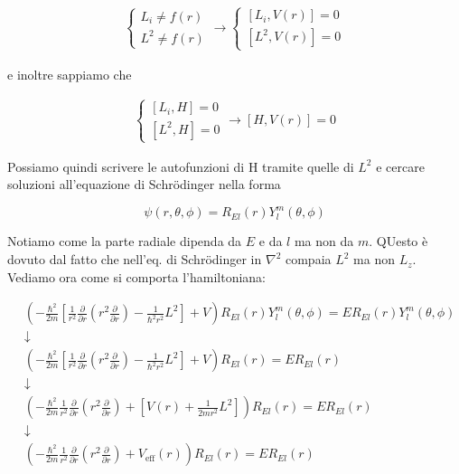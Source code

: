 \begin{align}
\left\{
\begin{array}{ccc}
L_i \neq f(r) \\
L^2 \neq f(r)
\end{array}
\right. 
\rightarrow
\left\{
\begin{array}{ccc}
\left[L_i,V(r) \right]=0 \\
\left[L^2,V(r)\right]=0
\end{array}
\right. 
\end{align}

e inoltre sappiamo che

\begin{align}
\left\{
\begin{array}{ccc}
\left[L_i,H \right]=0 \\
\left[L^2,H\right]=0
\end{array}
\right.
\rightarrow
[H,V(r)]=0
\end{align}

Possiamo quindi scrivere le autofunzioni di H tramite quelle di $L^2$ e cercare soluzioni all'equazione di Schrödinger nella forma

\begin{equation}
\psi(r,\theta,\phi)= R_{El}(r)Y_l^m(\theta,\phi)
\end{equation}

Notiamo come la parte radiale dipenda da $E$ e da $l$ ma non da $m$. QUesto è dovuto dal fatto che nell'eq. di Schrödinger in $\nabla^2$ compaia $L^2$ ma non $L_z$. \newline
\newpage
Vediamo ora come si comporta l'hamiltoniana:


\begin{align}
{}&\left(-\frac{\hbar^2}{2 m}
\left[
\frac{1}{r^2}\frac{\partial}{\partial r}\left(  r^2  \frac{\partial}{\partial r}  \right) - \frac{1}{\hbar^2 r^2}L^2
\right]   + V \right) R_{El}(r)Y_l^m(\theta,\phi) = E R_{El}(r)Y_l^m(\theta,\phi) \nonumber \\
&\downarrow \nonumber \\
&\left(-\frac{\hbar^2}{2 m}
\left[
\frac{1}{r^2}\frac{\partial}{\partial r}\left(  r^2  \frac{\partial}{\partial r}  \right) - \frac{1}{\hbar^2 r^2}L^2
\right]   + V \right) R_{El}(r) = E R_{El}(r) \nonumber \\
&\downarrow \nonumber \\
& \left( -\frac{\hbar^2}{2 m} \frac{1}{r^2}\frac{\partial}{\partial r}\left(  r^2  \frac{\partial}{\partial r}  \right) + \left[ V(r) +  \frac{1}{2m r^2}L^2 \right] \right) R_{El}(r) = E R_{El}(r) \nonumber \\
&\downarrow \nonumber \\
&\left( -\frac{\hbar^2}{2 m} \frac{1}{r^2}\frac{\partial}{\partial r}\left(  r^2  \frac{\partial}{\partial r}  \right) + V_{\text{eff}}(r) \right) R_{El}(r) = E R_{El}(r)
\end{align}


